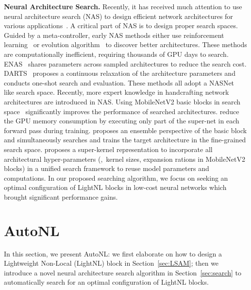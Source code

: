 \documentclass[10pt,twocolumn,letterpaper]{article}
\begin{document}
\vspace{0.5ex}\noindent\textbf{Neural Architecture Search.}
Recently, it has received much attention to use neural architecture search (NAS) to design efficient network architectures for various applications~\cite{tan2019efficientnet,ghiasi2019fpn,liu2019auto,yu2019c2fnas,jin2019adabits}.
A critical part of NAS is to design proper search spaces.
Guided by a meta-controller, early NAS methods either use reinforcement learning~\cite{zoph2017nasnet} or evolution algorithm~\cite{real2019amoebanet} to discover better architectures. These methods are computationally inefficient, requiring thousands of GPU days to search. ENAS~\cite{hieu2018enas} shares parameters across sampled architectures to reduce the search cost. DARTS~\cite{liu2018darts} proposes a continuous relaxation of the architecture parameters and conducts one-shot search and evaluation. These methods all adopt a NASNet~\cite{zoph2017nasnet} like search space. Recently, more expert knowledge in handcrafting network architectures are introduced in NAS. Using MobileNetV2 basic blocks in search space~\cite{han2019proxyless,wu2019fbnet,tan2019mnasnet,tan2019mixnet,stamoulis2019single,zichao2019uniform_sampling,mei2020atomnas} significantly improves the performance of searched architectures. \cite{han2019proxyless,zichao2019uniform_sampling} reduce the GPU memory consumption by executing only part of the super-net in each forward pass during training.
\cite{mei2020atomnas} proposes an ensemble perspective of the basic block and simultaneously searches and trains the target architecture in the fine-grained search space.
\cite{stamoulis2019single} proposes a super-kernel representation to incorporate all architectural hyper-parameters (\eg,~kernel sizes, expansion rations in MobileNetV2 blocks) in a unified search framework to reuse model parameters and computations. In our proposed searching algorithm, we focus on seeking an optimal configuration of LightNL blocks in low-cost neural networks which brought significant performance gains. 




\section{AutoNL}
In this section, we present AutoNL: we first elaborate on how to design a Lightweight Non-Local (LightNL) block in Section~\ref{sec:LSAM}; 
then we introduce a novel neural architecture search algorithm in Section~\ref{sec:search} to automatically search for an optimal configuration of LightNL blocks.
\end{document}

